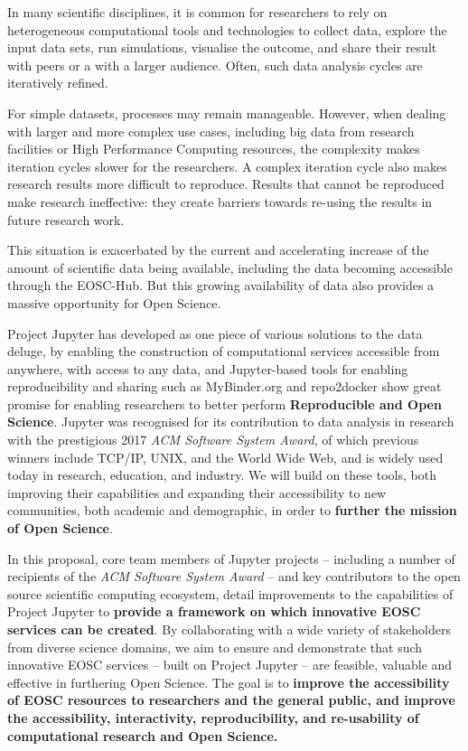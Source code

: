 
In many scientific disciplines, it is common for researchers to rely on
heterogeneous computational tools and technologies to collect data,
explore the input data sets, run simulations, visualise the outcome,
and share their result with peers or a with a larger audience. Often,
such data analysis cycles are iteratively refined.

For simple datasets, processes may remain manageable. However, when
dealing with larger and more complex use cases, including big data
from research facilities or High Performance Computing resources, the
complexity makes iteration cycles slower for the researchers. A
complex iteration cycle also makes research results more difficult to
reproduce.
Results that cannot be reproduced make research ineffective: they
create barriers towards re-using the results in future research work.

This situation is exacerbated by the current and accelerating increase of the amount
of scientific data being available, including the data becoming
accessible through the EOSC-Hub. But this growing availability of data also provides a massive opportunity
for Open Science.

Project Jupyter has developed as one piece of various solutions to the data deluge,
by enabling the construction of computational services accessible from anywhere,
with access to any data,
and Jupyter-based tools for %
enabling reproducibility and sharing such as MyBinder.org and repo2docker
show great promise for enabling researchers to better perform \textbf{Reproducible and Open Science}.
Jupyter was recognised for its contribution to data analysis in research with the prestigious 2017 \emph{ACM Software System Award}, of which previous winners include TCP/IP, UNIX, and the World Wide Web,
and is widely used today in research,
education, and industry.
We will build on these tools,
both improving their capabilities
and expanding their accessibility to new communities,
both academic and demographic,
in order to \textbf{further the mission of Open Science}.

In this proposal, core team members of Jupyter projects -- including a
number of recipients of the \emph{ACM Software System Award} -- and key contributors to the
open source scientific computing ecosystem,
detail improvements to the
capabilities of Project Jupyter
to \textbf{provide a framework on which innovative EOSC services can be created}.
By collaborating with a wide variety of stakeholders from diverse
science domains,
we aim to ensure and demonstrate that such
innovative EOSC services -- built on Project Jupyter -- are feasible, valuable and effective in furthering Open Science.
The goal is to \textbf{improve the
accessibility of EOSC resources to researchers and the general public,
and improve the accessibility, interactivity, reproducibility, and
re-usability of computational research
and Open Science.}


